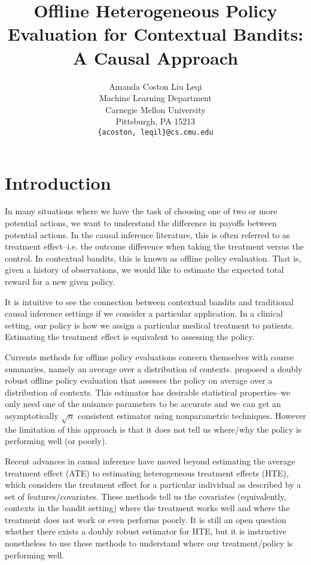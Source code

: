 \documentclass{article}
\title{%
Offline Heterogeneous Policy Evaluation for Contextual Bandits: A Causal Approach}
\author{
  Amanda Coston \quad Liu Leqi\\
  Machine Learning Department\\
  Carnegie Mellon University\\
  Pittsburgh, PA 15213 \\
  \texttt{\{acoston, leqil\}@cs.cmu.edu} \\
}
\begin{document}
\maketitle
\section{Introduction}
In many situations where we have the task of choosing one of two or more potential actions, we want to understand the difference in payoffs between potential actions. In the causal inference literature, this is often referred to as treatment effect--i.e. the outcome difference when taking the treatment versus the control. In contextual bandits, this is known as offline policy evaluation. That is, given a history of observations, we would like to estimate the expected total reward for a new given policy. 

 It is intuitive to see the connection between contextual bandits and traditional causal inference settings if we consider a particular application. In a clinical setting, our policy is how we assign a particular medical treatment to patients. Estimating the treatment effect is equivalent to assessing the policy.

Currents methods for offline policy evaluations concern themselves with course summaries, namely an average over a distribution of contexts. \cite{dudik2014doubly} proposed a doubly robust offline policy evaluation that assesses the policy on average over a distribution of contexts. This estimator has desirable statistical properties--we only need one of the nuisance parameters to be accurate and we can get an asymptotically $\sqrt{n}$ consistent estimator using nonparametric techniques. However the limitation of this approach is that it does not tell us where/why the policy is performing well (or poorly).

Recent advances in causal inference have moved beyond estimating the average treatment effect (ATE) to estimating heterogeneous treatment effects (HTE), which considers the treatment effect for a particular individual as described by a set of features/covariates. These methods tell us the covariates (equivalently, contexts in the bandit setting) where the treatment works well and where the treatment does not work or even performs poorly. It is still an open question whether there exists a doubly robust estimator for HTE, but it is instructive nonetheless to use these methods to understand where our treatment/policy is performing well.
\end{document}
